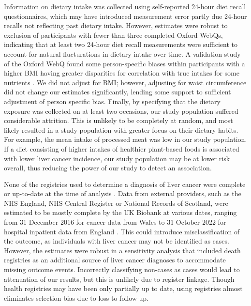\documentclass[nutrients,article,submit,moreauthors,pdftex]{Definitions/mdpi}
\begin{document}
Information on dietary intake was collected using self-reported 24-hour
diet recall questionnaires, which may have introduced measurement error
partly due 24-hour recalls not reflecting past dietary intake. However,
estimates were robust to exclusion of participants with fewer than three
completed Oxford WebQs, indicating that at least two 24-hour diet recall
measurements were sufficient to account for natural flucturations in
dietary intake over time. A validation study of the Oxford WebQ found
some person-specific biases within participants with a higher BMI having
greater disparities for correlation with true intakes for some nutrients
\citep{Greenwood2019}. We did not adjust for BMI; however, adjusting for
waist circumference did not change our estimates significantly, lending
some support to sufficient adjustment of person specific bias. Finally,
by specifying that the dietary exposure was collected on at least two
occasions, our study population suffered considerable attrition. This is
unlikely to be completely at random, and most likely resulted in a study
population with greater focus on their dietary habits. For example, the
mean intake of processed meat was low in our study population. If a diet
consisting of higher intakes of healthier plant-based foods is
associated with lower liver cancer incidence, our study population may
be at lower risk overall, thus reducing the power of our study to detect
an association.

None of the registries used to determine a diagnosis of liver cancer
were complete or up-to-date at the time of analysis \citep{RN112}. Data
from external providers, such as the NHS England, NHS Central Register
or National Records of Scotland, were estimated to be mostly complete by
the UK Biobank at various dates, ranging from 31 December 2016 for
cancer data from Wales to 31 October 2022 for hospital inpatient data
from England \citep{RN114}. This could introduce misclassification of
the outcome, as individuals with liver cancer may not be identified as
cases. However, the estimates were robust in a sensitivity analysis that
included death registries as an additional source of liver cancer
diagnoses to accommodate missing outcome events. Incorrectly classifying
non-cases as cases would lead to attenuation of our results, but this is
unlikely due to register linkage. Though health registries may have been
only partially up to date, using registries almost eliminates selection
bias due to loss to follow-up.
\end{document}
